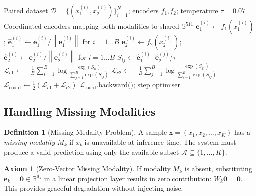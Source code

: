 \documentclass[12pt,a4paper]{article}
\theoremstyle{definition}
\newtheorem{definition}{Definition}[section]
\newtheorem{axiom}{Axiom}[section]
\theoremstyle{plain}
\theoremstyle{remark}
\newcommand{\R}{\mathbb{R}}
\newcommand{\Sph}{\mathbb{S}}
\newcommand{\Norm}[1]{\left\|#1\right\|}
\begin{document}
\begin{algorithm}[H]
\caption{Coordinated Representation Learning (Symmetric Contrastive)}
\label{alg:coord_repr}
\begin{algorithmic}[1]
\Require Paired dataset $\mathcal{D} = \{(x_1^{(i)}, x_2^{(i)})\}_{i=1}^N$; encoders $f_1, f_2$; temperature $\tau = 0.07$
\Ensure Coordinated encoders mapping both modalities to shared $\Sph^{511}$
  \State $\mathbf{e}_1^{(i)} \gets f_1(x_1^{(i)})$; $\hat{\mathbf{e}}_1^{(i)} \gets \mathbf{e}_1^{(i)}/\Norm{\mathbf{e}_1^{(i)}}$ for $i=1\ldots B$
  \State $\mathbf{e}_2^{(i)} \gets f_2(x_2^{(i)})$; $\hat{\mathbf{e}}_2^{(i)} \gets \mathbf{e}_2^{(i)}/\Norm{\mathbf{e}_2^{(i)}}$ for $i=1\ldots B$
  \State $S_{ij} \gets \hat{\mathbf{e}}_1^{(i)} \cdot \hat{\mathbf{e}}_2^{(j)} / \tau$ 
  \State $\mathcal{L}_{c1} \gets -\frac{1}{B}\sum_{i=1}^B\log\frac{\exp(S_{ii})}{\sum_{j=1}^B \exp(S_{ij})}$
  \State $\mathcal{L}_{c2} \gets -\frac{1}{B}\sum_{j=1}^B\log\frac{\exp(S_{jj})}{\sum_{i=1}^B \exp(S_{ij})}$
  \State $\mathcal{L}_{\text{coord}} \gets \frac{1}{2}(\mathcal{L}_{c1} + \mathcal{L}_{c2})$
  \State $\mathcal{L}_{\text{coord}}.\text{backward()}$; step optimiser
\EndFor
\end{algorithmic}
\end{algorithm}

\subsection{Handling Missing Modalities}

\begin{definition}[Missing Modality Problem]
A sample $\mathbf{x} = (x_1, x_2, \ldots, x_K)$ has a \emph{missing modality} $M_k$ if $x_k$ is unavailable at inference time. The system must produce a valid prediction using only the available subset $\mathcal{A} \subseteq \{1,\ldots,K\}$.
\end{definition}

\begin{axiom}[Zero-Vector Missing Modality]
\label{ax:missing}
If modality $M_k$ is absent, substituting $\mathbf{e}_k = \bm{0} \in \R^{d_k}$ in a linear projection layer results in zero contribution: $W_k \bm{0} = \bm{0}$. This provides graceful degradation without injecting noise.
\end{axiom}
\end{document}
